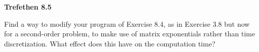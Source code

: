 \textbf{Trefethen 8.5}

Find a way to modify your program of Exercise 8.4, as in Exercise 3.8 but now
for a second-order problem, to make use of matrix exponentials rather than time
discretization. What effect does this have on the computation time?

\begin{solution}
  \ \\
  \vfill
\end{solution}